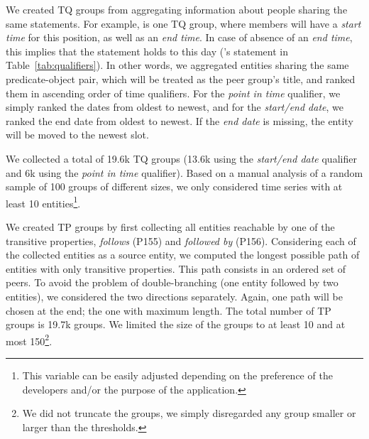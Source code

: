 We created TQ groups from aggregating information about people sharing the same statements. For example,  is one TQ group, where members will have a \textit{start time} for this position, as well as an \textit{end time}. In case of absence of an \textit{end time}, this implies that the statement holds to this day ('s statement in Table~\ref{tab:qualifiers}). In other words, we aggregated entities sharing the same predicate-object pair, which will be treated as the peer group's title, and ranked them in ascending order of time qualifiers. For the \textit{point in time} qualifier, we simply ranked the dates from oldest to newest, and for the \textit{start/end date}, we ranked the end date from oldest to newest.
If the \textit{end date} is missing, the entity will be moved to the newest slot.

We collected a total of 19.6k TQ groups (13.6k using the \textit{start/end date} qualifier and 6k using the \textit{point in time} qualifier). Based on a manual analysis of a random sample of 100 groups of different sizes, we only considered time series with at least 10 entities\footnote{This variable can be easily adjusted depending on the preference of the developers and/or the purpose of the application.}.

We created TP groups by first collecting all entities reachable by one of the transitive properties, \textit{follows} (P155) and \textit{followed by} (P156). Considering each of the collected entities as a source entity, we computed the longest possible path of entities with only transitive properties. This path consists in an ordered set of peers. To avoid the problem of double-branching (one entity followed by two entities), we considered the two directions separately. Again, one path will be chosen at the end; the one with maximum length. 
The total number of TP groups is 19.7k groups. We limited the size of the groups to at least 10 and at most 150\footnote{We did not truncate the groups, we simply disregarded any group smaller or larger than the thresholds.}. 

\begin{table*}
  \caption{Samples of temporal information in Wikidata.}
  \label{tab:qualifiers}
  \centering
  \end{table*}
  
